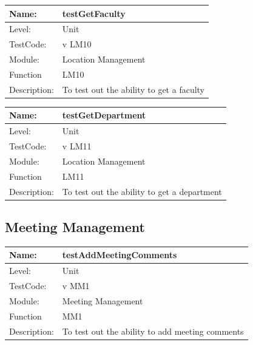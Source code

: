 \documentclass[12pt]{article}
\begin{document}
\begin{flushleft}
\begin{center}
\begin{tabular}{|l|p{12cm}|}
 Name: & testGetFaculty \\
 \hline
Level: & Unit \\
\hline
TestCode: & v LM10 \\
\hline
Module:& Location Management \\
\hline
Function & LM10 \\
\hline
Description: & To test out the ability to get a faculty \\
\hline
\end{tabular}
\end{center}

\begin{center}
\begin{tabular}{|l|p{12cm}|}
\hline

 Name: & testGetDepartment \\
 \hline
Level: & Unit \\
\hline
TestCode: & v LM11 \\
\hline
Module:& Location Management \\
\hline
Function & LM11 \\
\hline
Description: & To test out the ability to get a department \\
\hline
\end{tabular}
\end{center}

\subsection{Meeting Management}
\begin{center}
\begin{tabular}{|l|p{12cm}|}
\hline

 Name: & testAddMeetingComments  \\
\hline
Level: & Unit \\
\hline
TestCode: & v MM1 \\
\hline
Module:& Meeting Management \\
\hline
Function & MM1 \\
\hline
Description: & To test out the ability to add meeting comments  \\
\hline

\end{tabular}
\end{center}

\begin{center}
\begin{tabular}{|l|p{12cm}|}
\hline


\end{tabular}
\end{center}
\end{flushleft}
\end{document}
